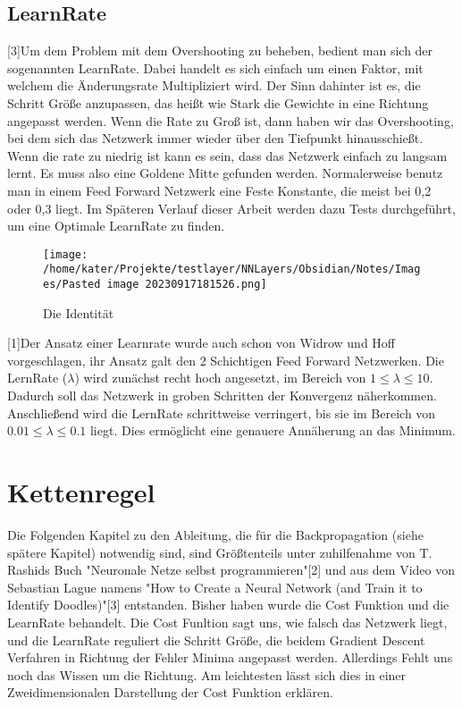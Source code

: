 \documentclass[12pt]{article}
\begin{document}
\subsection{ LearnRate}[3]Um dem Problem mit dem Overshooting zu beheben, bedient man sich der sogenannten LearnRate. Dabei handelt es sich einfach um einen Faktor, mit welchem die Änderungsrate Multipliziert wird. Der Sinn dahinter ist es, die Schritt Größe anzupassen, das heißt wie Stark die Gewichte in eine Richtung angepasst werden. Wenn die Rate zu Groß ist, dann haben wir das Overshooting, bei dem sich das Netzwerk immer wieder über den Tiefpunkt hinausschießt. Wenn die rate zu niedrig ist kann es sein, dass das Netzwerk einfach zu langsam lernt. Es muss also eine Goldene Mitte gefunden werden. Normalerweise benutz man in einem Feed Forward Netzwerk eine Feste Konstante, die meist bei 0,2 oder 0,3 liegt. Im Späteren Verlauf dieser Arbeit werden dazu Tests durchgeführt, um eine Optimale LearnRate zu finden.\begin{figure}[H]
\centering
\texttt{[image: /home/kater/Projekte/testlayer/NNLayers/Obsidian/Notes/Images/Pasted image 20230917181526.png]}
\caption{Die Identität}
\label{Was kommt hier rein?}\end{figure}[1]Der Ansatz einer Learnrate wurde auch schon von Widrow und Hoff vorgeschlagen, ihr Ansatz galt den 2 Schichtigen Feed Forward Netzwerken. Die LernRate ($\lambda$) wird zunächst recht hoch angesetzt, im Bereich von $1 \le \lambda \le 10$. Dadurch soll das Netzwerk in groben Schritten der Konvergenz näherkommen. Anschließend wird die LernRate schrittweise verringert, bis sie im Bereich von $0.01 \le \lambda \le 0.1$ liegt. Dies ermöglicht eine genauere Annäherung an das Minimum.\section{ Kettenregel}Die Folgenden Kapitel zu den Ableitung, die für die Backpropagation (siehe spätere Kapitel) notwendig sind, sind Größtenteils unter zuhilfenahme von T. Rashids Buch "Neuronale Netze selbst programmieren"[2] und aus dem Video von Sebastian Lague namens "How to Create a Neural Network (and Train it to Identify Doodles)"[3] entstanden. 
Bisher haben wurde die Cost Funktion und die LearnRate behandelt. Die Cost Funltion sagt uns, wie falsch das Netzwerk liegt, und die LearnRate reguliert die Schritt Größe, die beidem Gradient Descent Verfahren in Richtung der Fehler Minima angepasst werden. Allerdings Fehlt uns noch das Wissen um die Richtung. 
Am leichtesten lässt sich dies in einer Zweidimensionalen Darstellung der Cost Funktion erklären.
\end{document}

